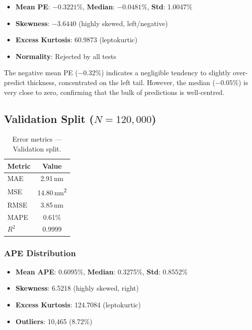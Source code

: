 \documentclass[11pt,a4paper]{article}
\begin{document}
\begin{itemize}
  \item \textbf{Mean PE}: $-0.3221$\%, \textbf{Median}: $-0.0481$\%, \textbf{Std}: 1.0047\%
  \item \textbf{Skewness}: $-3.6440$ (highly skewed, left/negative)
  \item \textbf{Excess Kurtosis}: 60.9873 (leptokurtic)
  \item \textbf{Normality}: Rejected by all tests
\end{itemize}

The negative mean PE ($-0.32\%$) indicates a negligible tendency to slightly over-predict thickness, concentrated on the left tail. However, the median ($-0.05\%$) is very close to zero, confirming that the bulk of predictions is well-centred.

\subsection{Validation Split ($N = 120,000$)}

\begin{table}[H]
\centering
\caption{Error metrics — Validation split.}
\label{tab:metrics_val}
\begin{tabular}{lc}
\toprule
\textbf{Metric} & \textbf{Value} \\
\midrule
MAE                 & 2.91\,nm \\
MSE                 & 14.80\,nm\textsuperscript{2} \\
RMSE                & 3.85\,nm \\
MAPE                & 0.61\% \\
$R^2$               & 0.9999 \\
\bottomrule
\end{tabular}
\end{table}

\subsubsection{APE Distribution}

\begin{itemize}
  \item \textbf{Mean APE}: 0.6095\%, \textbf{Median}: 0.3275\%, \textbf{Std}: 0.8552\%
  \item \textbf{Skewness}: 6.5218 (highly skewed, right)
  \item \textbf{Excess Kurtosis}: 124.7084 (leptokurtic)
  \item \textbf{Outliers}: 10,465 (8.72\%)
\end{itemize}
\end{document}
